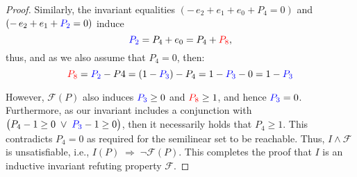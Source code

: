 \begin{proof}
	
	\noindent
	Similarly, the invariant equalities 
	$(-\,e_{2}+e_{1}+e_{0}+P_{4}=0)$ and $(	-\,e_{2}+e_{1}+\textcolor{blue}{P_{2}}=0)$
	induce
	\[
	\textcolor{blue}{P_{2}}=P_{4}+e_{0}=P_{4}+\textcolor{red}{P_{8}},
	\]
	thus, and as we also assume that $P_4=0$, then:
	\[
	\textcolor{red}{P_{8}}=\textcolor{blue}{P_2}-P4=(1-\textcolor{blue}{P_{3}})-P_{4}=1-\textcolor{blue}{P_{3}}-0=1-\textcolor{blue}{P_{3}}
	\]
	
	
	
	
	\noindent
	However, $\mathcal {F}(P)$ also induces $\textcolor{blue}{P_{3}}\ge0$ and $\textcolor{red}{P_{8}}\ge1$, and hence $\textcolor{blue}{P_{3}}=0$.  
	Furthermore, as our invariant includes a conjunction with $\bigl(P_{4}-1\ge0\;\lor\;\textcolor{blue}{P_{3}}-1\ge0\bigr)$, then it necessarily holds that \(P_{4}\ge1\). This contradicts \(P_{4}=0\) as required for the semilinear set to be reachable.
	Thus, $I\land\mathcal {F}$ is unsatisfiable, i.e., 
	$
	I(P)\;\Longrightarrow\;\neg\mathcal {F}(P)$.
	This completes the proof that $I$ is an inductive invariant refuting property $\mathcal {F}$.
\end{proof}


